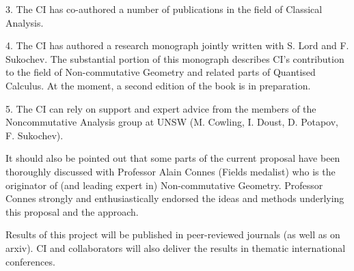\documentclass[12pt]{article}
\newcommand{\archeading}[1]{\vspace{.3cm} \noindent{\bfseries #1} \vspace{.1cm}   }
\begin{document}
3. The CI has co-authored a number of publications in the field of Classical Analysis.

4. The CI has authored a research monograph \cite{book} jointly written with S. Lord and F. Sukochev. The substantial portion of this monograph describes CI's contribution to the field of Non-commutative Geometry and related parts of Quantised Calculus. At the moment, a second edition of the book is in preparation.

5. The CI can rely on support and expert advice from the members of the Noncommutative
Analysis group at UNSW (M. Cowling, I. Doust, D. Potapov, F. Sukochev).

It should also be pointed out that some parts of the current proposal have been thoroughly discussed with Professor Alain Connes (Fields medalist) who is the originator of (and leading expert in) Non-commutative Geometry. Professor Connes strongly and enthusiastically endorsed the ideas and methods underlying this proposal and the approach.

\archeading{Communication of results} Results of this project will be published in peer-reviewed journals (as well as on arxiv). CI and collaborators will also deliver the results in thematic international conferences.

\small
\end{document}
